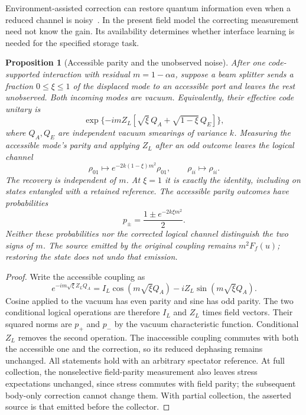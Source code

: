 \documentclass[11pt]{article}
\newtheorem{proposition}[theorem]{Proposition}
\theoremstyle{definition}
\theoremstyle{remark}
\begin{document}
Environment-assisted correction can restore quantum information even
when a reduced channel is noisy~\cite{GregorattiWerner2002}. In the
present field model the correcting measurement need not know the gain.
Its availability determines whether interface learning is needed for
the specified storage task.

\begin{proposition}[Accessible parity and the unobserved noise]
\label{prop:parity_recovery}
After one code-supported interaction with residual $m=1-\alpha a$,
suppose a beam splitter sends a fraction $0\le\xi\le1$ of the
displaced mode to an accessible port and leaves the rest unobserved. Both incoming
modes are vacuum. Equivalently, their effective code unitary is
\[
 \exp\{-imZ_L[\sqrt{\xi}\,Q_A+\sqrt{1-\xi}\,Q_E]\},
\]
where $Q_A,Q_E$ are independent vacuum smearings of variance $k$.
Measuring the accessible mode's parity and applying $Z_L$ after an odd
outcome leaves the logical channel
\begin{equation}
 \rho_{01}\longmapsto e^{-2k(1-\xi)m^2}\rho_{01},
 \qquad \rho_{ii}\longmapsto\rho_{ii}.
 \label{eq:partial_parity_recovery}
\end{equation}
The recovery is independent of $m$. At $\xi=1$ it is exactly the identity,
including on states entangled with a retained reference. The accessible
parity outcomes have probabilities
\[
 p_\pm=\frac{1\pm e^{-2k\xi m^2}}2.
\]
Neither these probabilities nor the corrected logical channel distinguish
the two signs of $m$. The source emitted by the original coupling remains
$m^2 F_f(u)$; restoring the state does not undo that emission.
\end{proposition}
\begin{proof}
Write the accessible coupling as
\[
 e^{-im\sqrt{\xi}Z_LQ_A}
 = I_L\cos(m\sqrt{\xi}Q_A)-iZ_L\sin(m\sqrt{\xi}Q_A).
\]
Cosine applied to the vacuum has even parity and sine has odd parity.
The two conditional logical operations are therefore $I_L$ and $Z_L$
times field vectors. Their squared norms are $p_+$ and $p_-$ by the
vacuum characteristic function. Conditional $Z_L$ removes the second
operation. The inaccessible coupling commutes with both the accessible
one and the correction, so its reduced dephasing remains unchanged.
All statements hold with an arbitrary spectator reference. At full
collection, the nonselective field-parity measurement also leaves stress
expectations unchanged, since stress commutes with field parity; the
subsequent body-only correction cannot change them. With partial
collection, the asserted source is that emitted before the collector.
\end{proof}
\end{document}
